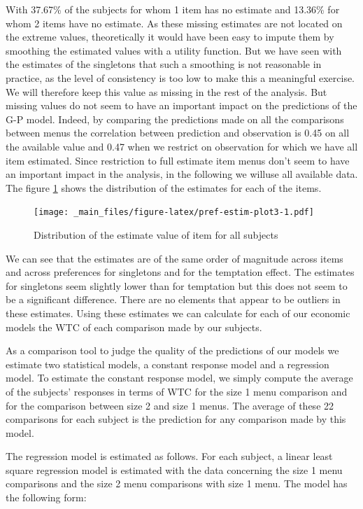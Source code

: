 \documentclass[
]{book}
\begin{document}
With 37.67\% of the subjects for whom 1 item has no
estimate and 13.36\% for whom 2 items have no estimate.
As these missing estimates are not located on the extreme values, theoretically
it would have been easy to impute them by smoothing the estimated values with a
utility function.
But we have seen with the estimates of the singletons that such a smoothing is
not reasonable in practice, as the level of consistency is too low to make this
a meaningful exercise.
We will therefore keep this value as missing in the rest of the analysis.
But missing values do not seem to have an
important impact on the predictions of the G-P model.
Indeed, by comparing the predictions made on all the comparisons between menus
the correlation between prediction and observation is
0.45 on all the available
value and
0.47
when we restrict on observation for which we have all item estimated.
Since restriction to full estimate item menus don't seem to have an important
impact in the analysis, in the following we willuse all available data.
The figure \ref{fig:pref-estim-plot3} shows the distribution of the estimates
for each of the items.

\begin{figure}
\centering
\texttt{[image: \_main\_files/figure-latex/pref-estim-plot3-1.pdf]}
\caption{\label{fig:pref-estim-plot3}Distribution of the estimate value of item for all subjects}
\end{figure}

We can see that the estimates are of the same order of magnitude across items
and across preferences for singletons and for the temptation effect.
The estimates for singletons seem slightly lower than for temptation but this
does not seem to be a significant difference.
There are no elements that appear to be outliers in these estimates.
Using these estimates we can calculate for each of our economic models the WTC
of each comparison made by our subjects.

As a comparison tool to judge the quality of the predictions of our models we
estimate two statistical models, a constant response model and a regression
model.
To estimate the constant response model, we simply compute the average of the
subjects' responses in terms of WTC for the size 1 menu comparison and for the
comparison between size 2 and size 1 menus.
The average of these 22 comparisons for each subject is the prediction for any
comparison made by this model.

The regression model is estimated as follows.
For each subject, a linear least square regression model is estimated with the
data concerning the size 1 menu comparisons and the size 2 menu comparisons with
size 1 menu.
The model has the following form:
\end{document}
